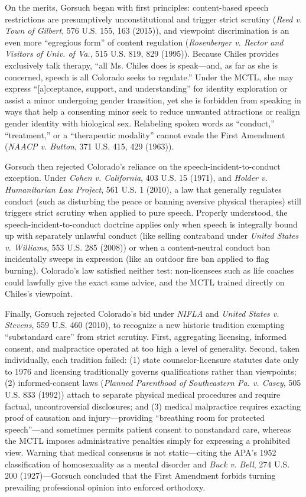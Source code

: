 \documentclass[12pt]{article}
\begin{document}
On the merits, Gorsuch began with first principles: content-based speech restrictions are presumptively unconstitutional and trigger strict scrutiny (\textit{Reed v. Town of Gilbert}, 576 U.S. 155, 163 (2015)), and viewpoint discrimination is an even more ``egregious form'' of content regulation (\textit{Rosenberger v. Rector and Visitors of Univ. of Va.}, 515 U.S. 819, 829 (1995)). Because Chiles provides exclusively talk therapy, ``all Ms. Chiles does is speak---and, as far as she is concerned, speech is all Colorado seeks to regulate.'' Under the MCTL, she may express ``[a]cceptance, support, and understanding'' for identity exploration or assist a minor undergoing gender transition, yet she is forbidden from speaking in ways that help a consenting minor seek to reduce unwanted attractions or realign gender identity with biological sex. Relabeling spoken words as ``conduct,'' ``treatment,'' or a ``therapeutic modality'' cannot evade the First Amendment (\textit{NAACP v. Button}, 371 U.S. 415, 429 (1963)).

Gorsuch then rejected Colorado's reliance on the speech-incident-to-conduct exception. Under \textit{Cohen v. California}, 403 U.S. 15 (1971), and \textit{Holder v. Humanitarian Law Project}, 561 U.S. 1 (2010), a law that generally regulates conduct (such as disturbing the peace or banning aversive physical therapies) still triggers strict scrutiny when applied to pure speech. Properly understood, the speech-incident-to-conduct doctrine applies only when speech is integrally bound up with separately unlawful conduct (like selling contraband under \textit{United States v. Williams}, 553 U.S. 285 (2008)) or when a content-neutral conduct ban incidentally sweeps in expression (like an outdoor fire ban applied to flag burning). Colorado's law satisfied neither test: non-licensees such as life coaches could lawfully give the exact same advice, and the MCTL trained directly on Chiles's viewpoint.

Finally, Gorsuch rejected Colorado's bid under \textit{NIFLA} and \textit{United States v. Stevens}, 559 U.S. 460 (2010), to recognize a new historic tradition exempting ``substandard care'' from strict scrutiny. First, aggregating licensing, informed consent, and malpractice operated at too high a level of generality. Second, taken individually, each tradition failed: (1) state counselor-licensure statutes date only to 1976 and licensing traditionally governs qualifications rather than viewpoints; (2) informed-consent laws (\textit{Planned Parenthood of Southeastern Pa. v. Casey}, 505 U.S. 833 (1992)) attach to separate physical medical procedures and require factual, uncontroversial disclosures; and (3) medical malpractice requires exacting proof of causation and injury---providing ``breathing room for protected speech''---and sometimes permits patient consent to nonstandard care, whereas the MCTL imposes administrative penalties simply for expressing a prohibited view. Warning that medical consensus is not static---citing the APA's 1952 classification of homosexuality as a mental disorder and \textit{Buck v. Bell}, 274 U.S. 200 (1927)---Gorsuch concluded that the First Amendment forbids turning prevailing professional opinion into enforced orthodoxy.
\end{document}
